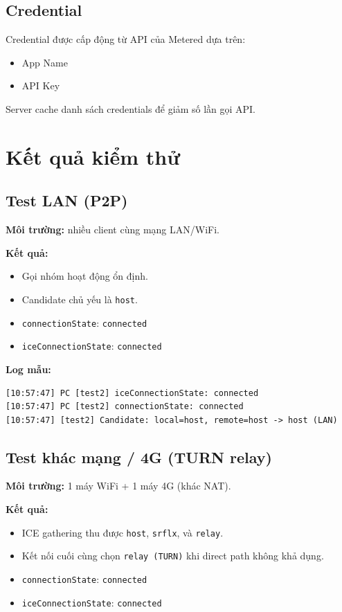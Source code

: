\documentclass[12pt,a4paper]{article}
\begin{document}
\subsection{Credential}
Credential được cấp động từ API của Metered dựa trên:
\begin{itemize}[leftmargin=1.5em]
  \item App Name
  \item API Key
\end{itemize}
Server cache danh sách credentials để giảm số lần gọi API.

\section{Kết quả kiểm thử}

\subsection{Test LAN (P2P)}
\textbf{Môi trường:} nhiều client cùng mạng LAN/WiFi.

\textbf{Kết quả:}
\begin{itemize}[leftmargin=1.5em]
  \item Gọi nhóm hoạt động ổn định.
  \item Candidate chủ yếu là \texttt{host}.
  \item \texttt{connectionState}: \texttt{connected}
  \item \texttt{iceConnectionState}: \texttt{connected}
\end{itemize}

\textbf{Log mẫu:}
\begin{lstlisting}
[10:57:47] PC [test2] iceConnectionState: connected
[10:57:47] PC [test2] connectionState: connected
[10:57:47] [test2] Candidate: local=host, remote=host -> host (LAN)
\end{lstlisting}

\subsection{Test khác mạng / 4G (TURN relay)}
\textbf{Môi trường:} 1 máy WiFi + 1 máy 4G (khác NAT).

\textbf{Kết quả:}
\begin{itemize}[leftmargin=1.5em]
  \item ICE gathering thu được \texttt{host}, \texttt{srflx}, và \texttt{relay}.
  \item Kết nối cuối cùng chọn \texttt{relay (TURN)} khi direct path không khả dụng.
  \item \texttt{connectionState}: \texttt{connected}
  \item \texttt{iceConnectionState}: \texttt{connected}
\end{itemize}
\end{document}
